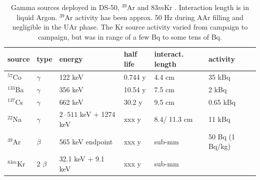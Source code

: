\begin{table}[htbp]
\centering
\caption{Gamma sources deployed in DS-50, $^{39}$Ar and $83m$Kr \cite{Lippincott:2010jb}. Interaction length is in liquid Argon. $^{39}$Ar activity has been approx. 50 Hz during AAr filling and negligible in the UAr phase. The Kr source activity varied from campaign to campaign, but was in range of a few Bq to some tens of Bq.} %
\centering
\begin{tabular}{|l|l|l|l|l|l|}
\hline
\textbf{source} & \textbf{type} & \textbf{energy} & \textbf{half life} & \textbf{interact. length} & \textbf{activity} \\ \hline
$^{57}$Co & $\gamma$ & 122 keV & 0.744 y & 4.4 cm & 35 kBq \\ \hline
$^{133}$Ba & $\gamma$ & 356 keV & 10.54 y & 7.5 cm & 2 kBq \\ \hline
$^{137}$Cs & $\gamma$ & 662 keV & 30.2 y & 9.5 cm & 0.65 kBq \\ \hline
$^{22}$Na & $\gamma$ & $2\cdot 511$ keV + 1274 keV & xxx y & 8.4/ 11.3 cm & 11 kBq \\ \hline\hline
$^{39}$Ar & $\beta$ &  565 keV endpoint& xxx y & sub-mm & 50 Bq (1 Bq/kg) \\ \hline
$^{83m}$Kr & 2 $\beta$ &  32.1 keV + 9.1 keV & xxx y & sub-mm & \\ \hline
\end{tabular}
\label{tbl:GammaSources}
\end{table}

